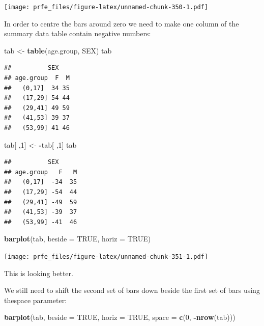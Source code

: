 \documentclass[12pt,a4paper]{book}
\newenvironment{Shaded}{\begin{snugshade}}{\end{snugshade}}
\newcommand{\KeywordTok}[1]{\textcolor[rgb]{0.13,0.29,0.53}{\textbf{#1}}}
\newcommand{\DataTypeTok}[1]{\textcolor[rgb]{0.13,0.29,0.53}{#1}}
\newcommand{\DecValTok}[1]{\textcolor[rgb]{0.00,0.00,0.81}{#1}}
\newcommand{\StringTok}[1]{\textcolor[rgb]{0.31,0.60,0.02}{#1}}
\newcommand{\OtherTok}[1]{\textcolor[rgb]{0.56,0.35,0.01}{#1}}
\newcommand{\OperatorTok}[1]{\textcolor[rgb]{0.81,0.36,0.00}{\textbf{#1}}}
\newcommand{\NormalTok}[1]{#1}
\theoremstyle{definition}
\theoremstyle{definition}
\theoremstyle{definition}
\theoremstyle{remark}
\begin{document}
\texttt{[image: prfe\_files/figure-latex/unnamed-chunk-350-1.pdf]}

In order to centre the bars around zero we need to make one column of
the summary data table contain negative numbers:

\begin{Shaded}
\begin{Highlighting}[]
\NormalTok{tab <-}\StringTok{ }\KeywordTok{table}\NormalTok{(age.group, SEX)}
\NormalTok{tab}
\end{Highlighting}
\end{Shaded}

\begin{verbatim}
##          SEX
## age.group  F  M
##   (0,17]  34 35
##   (17,29] 54 44
##   (29,41] 49 59
##   (41,53] 39 37
##   (53,99] 41 46
\end{verbatim}

\begin{Shaded}
\begin{Highlighting}[]
\NormalTok{tab[ ,}\DecValTok{1}\NormalTok{] <-}\StringTok{ }\OperatorTok{-}\NormalTok{tab[ ,}\DecValTok{1}\NormalTok{]}
\NormalTok{tab}
\end{Highlighting}
\end{Shaded}

\begin{verbatim}
##          SEX
## age.group   F   M
##   (0,17]  -34  35
##   (17,29] -54  44
##   (29,41] -49  59
##   (41,53] -39  37
##   (53,99] -41  46
\end{verbatim}

\begin{Shaded}
\begin{Highlighting}[]
\KeywordTok{barplot}\NormalTok{(tab, }\DataTypeTok{beside =} \OtherTok{TRUE}\NormalTok{, }\DataTypeTok{horiz =} \OtherTok{TRUE}\NormalTok{)}
\end{Highlighting}
\end{Shaded}

\texttt{[image: prfe\_files/figure-latex/unnamed-chunk-351-1.pdf]}

This is looking better.

We still need to shift the second set of bars down beside the first set
of bars using thespace parameter:

\begin{Shaded}
\begin{Highlighting}[]
\KeywordTok{barplot}\NormalTok{(tab, }\DataTypeTok{beside =} \OtherTok{TRUE}\NormalTok{, }\DataTypeTok{horiz =} \OtherTok{TRUE}\NormalTok{, }\DataTypeTok{space =} \KeywordTok{c}\NormalTok{(}\DecValTok{0}\NormalTok{, }\OperatorTok{-}\KeywordTok{nrow}\NormalTok{(tab)))}
\end{Highlighting}
\end{Shaded}
\end{document}
